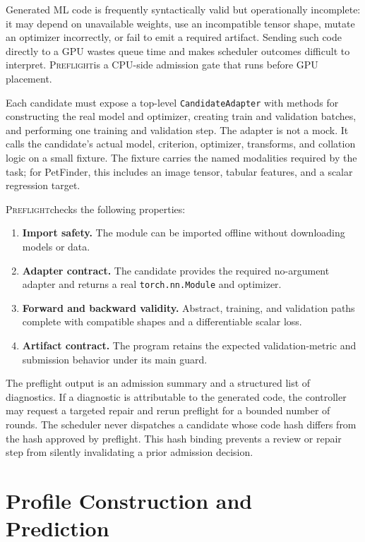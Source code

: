 \documentclass{article}
\newcommand{\preflight}{\textsc{Preflight}}
\begin{document}
Generated ML code is frequently syntactically valid but operationally incomplete: it may depend on unavailable weights, use an incompatible tensor shape, mutate an optimizer incorrectly, or fail to emit a required artifact. Sending such code directly to a GPU wastes queue time and makes scheduler outcomes difficult to interpret. \preflight is a CPU-side admission gate that runs before GPU placement.

Each candidate must expose a top-level \texttt{CandidateAdapter} with methods for constructing the real model and optimizer, creating train and validation batches, and performing one training and validation step. The adapter is not a mock. It calls the candidate's actual model, criterion, optimizer, transforms, and collation logic on a small fixture. The fixture carries the named modalities required by the task; for PetFinder, this includes an image tensor, tabular features, and a scalar regression target.

\preflight checks the following properties:
\begin{enumerate}
    \item \textbf{Import safety.} The module can be imported offline without downloading models or data.
    \item \textbf{Adapter contract.} The candidate provides the required no-argument adapter and returns a real \texttt{torch.nn.Module} and optimizer.
    \item \textbf{Forward and backward validity.} Abstract, training, and validation paths complete with compatible shapes and a differentiable scalar loss.
    \item \textbf{Artifact contract.} The program retains the expected validation-metric and submission behavior under its main guard.
\end{enumerate}

The preflight output is an admission summary and a structured list of diagnostics. If a diagnostic is attributable to the generated code, the controller may request a targeted repair and rerun preflight for a bounded number of rounds. The scheduler never dispatches a candidate whose code hash differs from the hash approved by preflight. This hash binding prevents a review or repair step from silently invalidating a prior admission decision.

\section{Profile Construction and Prediction}
\label{sec:prediction}
\end{document}
